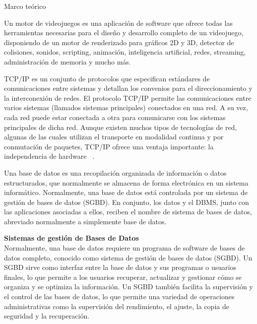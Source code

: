 \begin{thesischapter}{1} {Marco teórico}
    \vspace{10pt}

    \vspace{2pt}
    Un motor de videojuegos es una aplicación de software que ofrece todas las herramientas necesarias para el diseño y desarrollo completo de un videojuego, disponiendo de un motor de renderizado para gráficos 2D y 3D, detector de colisiones, sonidos, scripting, animación, inteligencia artificial, redes, streaming, administración de memoria y mucho más.~\cite{arce2011desarrollo} 
    
    \vspace{10pt}
    TCP/IP es un conjunto de protocolos que especifican estándares de comunicaciones entre sistemas y detallan los convenios para el direccionamiento y la interconexión de redes. El protocolo TCP/IP permite las comunicaciones entre varios sistemas (llamados sistemas principales) conectados en una red. A su vez, cada red puede estar conectada a otra para comunicarse con los sistemas principales de dicha red. Aunque existen muchos tipos de tecnologías de red, algunas de las cuales utilizan el transporte en modalidad continua y por conmutación de paquetes, TCP/IP ofrece una ventaja importante: la independencia de hardware ~\cite{protocolo-tcp-ip}.

    \vspace{10pt}
    Una base de datos es una recopilación organizada de información o datos estructurados, que normalmente se almacena de forma electrónica en un sistema informático. Normalmente, una base de datos está controlada por un sistema de gestión de bases de  datos (SGBD). En conjunto, los datos y el DBMS, junto con las aplicaciones asociadas a ellos, reciben el nombre de sistema de bases de datos, abreviado normalmente a simplemente base de datos.~\cite{Quéesuna68}

    \vspace{10pt}
    \textbf{Sistemas de gestión de Bases de Datos} \\
    Normalmente, una base de datos requiere un programa de software de bases de datos completo, conocido como sistema de gestión de  bases de datos (SGBD). Un SGBD sirve como interfaz entre la base de datos y sus programas o usuarios finales, lo que permite a los  usuarios recuperar, actualizar y gestionar cómo se organiza y se optimiza la información. Un SGBD también facilita la supervisión y el control de las bases de datos, lo que permite una variedad de operaciones administrativas como la supervisión del rendimiento, el ajuste, la copia de seguridad y la recuperación.~\cite{Quéesuna68}


\end{thesischapter}
